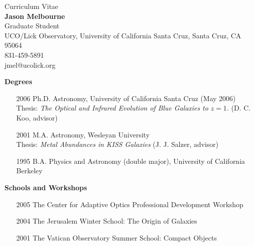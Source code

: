 \documentclass[12pt]{article}
\begin{document}
\begin{center}
Curriculum Vitae\\
{\Large\bf{Jason Melbourne}}\\
\textnormal
Graduate Student\\
UCO/Lick Observatory,
University of California Santa Cruz,
Santa Cruz, CA 95064\\
831-459-5891\\
jmel@ucolick.org
\end{center}

\noindent
{\bf{Degrees}}

\begin{itemize}
\addtolength{\itemsep}{-0.25cm}

\item[2006]  Ph.D. Astronomy, University of California Santa Cruz (May 2006)\\
	 Thesis: \emph{The Optical and Infrared Evolution of Blue Galaxies to $z=1$.} (D. C. Koo, advisor)
	 
\item[2001] M.A. Astronomy, Wesleyan University\\
 Thesis: \emph{Metal Abundances in KISS Galaxies} (J. J. Salzer, advisor) 

\item[1995] B.A. Physics and Astronomy (double major), University of California Berkeley

\end{itemize}

\noindent
{\bf{Schools and Workshops}}
\begin{itemize}
\addtolength{\itemsep}{-0.25cm}

\item[2005] The Center for Adaptive Optics Professional Development Workshop

\item[2004] The Jerusalem Winter School: The Origin of Galaxies 

\item[2001] The Vatican Observatory Summer School: Compact Objects 

\end{itemize}
\end{document}
